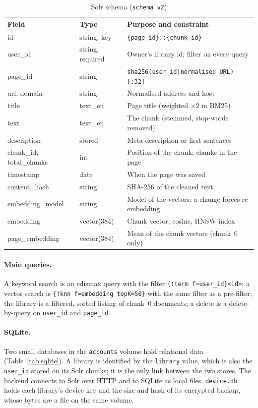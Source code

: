 \begin{table}[H]
\centering
\footnotesize
\begin{tabularx}{\textwidth}{>{\ttfamily}p{} p{} L}
\toprule
\textrm{\textbf{Field}} & \textbf{Type} & \textbf{Purpose and constraint} \\
\midrule
id & string, key & \texttt{\{page\_id\}::\{chunk\_id\}} \\
user\_id & string, required & Owner's library id; filter on every query \\
page\_id & string & \texttt{sha256(user\_id|normalised URL)[:32]} \\
url, domain & string & Normalised address and host \\
title & text\_en & Page title (weighted $\times 2$ in BM25) \\
text & text\_en & The chunk (stemmed, stop-words removed) \\
description & stored & Meta description or first sentences \\
chunk\_id, total\_chunks & int & Position of the chunk; chunks in the page \\
timestamp & date & When the page was saved \\
content\_hash & string & SHA-256 of the cleaned text \\
embedding\_model & string & Model of the vectors; a change forces re-embedding \\
embedding & vector(384) & Chunk vector, cosine, HNSW index \\
page\_embedding & vector(384) & Mean of the chunk vectors (chunk~0 only) \\
\bottomrule
\end{tabularx}
\caption{Solr schema (\texttt{schema v2})}
\label{tab:schema}
\end{table}

\paragraph{Main queries.} A keyword search is an edismax query with the
filter \texttt{\{!term f=user\_id\}<id>}; a vector search is
\texttt{\{!knn f=embedding topK=50\}} with the same filter as a pre-filter;
the library is a filtered, sorted listing of chunk~0 documents; a delete is a
delete-by-query on \texttt{user\_id} and \texttt{page\_id}.

\paragraph{SQLite.} Two small databases in the \texttt{accounts} volume hold
relational data (Table~\ref{tab:sqlite}). A library is identified by the
\texttt{library} value, which is also the \texttt{user\_id} stored on its Solr
chunks; it is the only link between the two stores. The backend connects to
Solr over HTTP and to SQLite as local files. \texttt{device.db} holds each
library's device key and the size and hash of its encrypted backup, whose
bytes are a file on the same volume.

